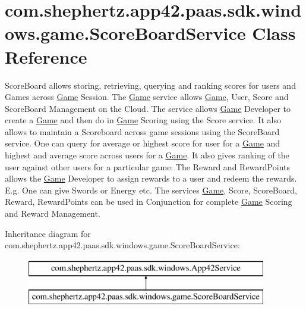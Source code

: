 \hypertarget{classcom_1_1shephertz_1_1app42_1_1paas_1_1sdk_1_1windows_1_1game_1_1_score_board_service}{\section{com.\+shephertz.\+app42.\+paas.\+sdk.\+windows.\+game.\+Score\+Board\+Service Class Reference}
\label{classcom_1_1shephertz_1_1app42_1_1paas_1_1sdk_1_1windows_1_1game_1_1_score_board_service}
}


Score\+Board allows storing, retrieving, querying and ranking scores for users and Games across \hyperlink{classcom_1_1shephertz_1_1app42_1_1paas_1_1sdk_1_1windows_1_1game_1_1_game}{Game} Session. The \hyperlink{classcom_1_1shephertz_1_1app42_1_1paas_1_1sdk_1_1windows_1_1game_1_1_game}{Game} service allows \hyperlink{classcom_1_1shephertz_1_1app42_1_1paas_1_1sdk_1_1windows_1_1game_1_1_game}{Game}, User, Score and Score\+Board Management on the Cloud. The service allows \hyperlink{classcom_1_1shephertz_1_1app42_1_1paas_1_1sdk_1_1windows_1_1game_1_1_game}{Game} Developer to create a \hyperlink{classcom_1_1shephertz_1_1app42_1_1paas_1_1sdk_1_1windows_1_1game_1_1_game}{Game} and then do in \hyperlink{classcom_1_1shephertz_1_1app42_1_1paas_1_1sdk_1_1windows_1_1game_1_1_game}{Game} Scoring using the Score service. It also allows to maintain a Scoreboard across game sessions using the Score\+Board service. One can query for average or highest score for user for a \hyperlink{classcom_1_1shephertz_1_1app42_1_1paas_1_1sdk_1_1windows_1_1game_1_1_game}{Game} and highest and average score across users for a \hyperlink{classcom_1_1shephertz_1_1app42_1_1paas_1_1sdk_1_1windows_1_1game_1_1_game}{Game}. It also gives ranking of the user against other users for a particular game. The Reward and Reward\+Points allows the \hyperlink{classcom_1_1shephertz_1_1app42_1_1paas_1_1sdk_1_1windows_1_1game_1_1_game}{Game} Developer to assign rewards to a user and redeem the rewards. E.\+g. One can give Swords or Energy etc. The services \hyperlink{classcom_1_1shephertz_1_1app42_1_1paas_1_1sdk_1_1windows_1_1game_1_1_game}{Game}, Score, Score\+Board, Reward, Reward\+Points can be used in Conjunction for complete \hyperlink{classcom_1_1shephertz_1_1app42_1_1paas_1_1sdk_1_1windows_1_1game_1_1_game}{Game} Scoring and Reward Management.  


Inheritance diagram for com.\+shephertz.\+app42.\+paas.\+sdk.\+windows.\+game.\+Score\+Board\+Service\+:\begin{figure}[H]
\begin{center}
\leavevmode
\includegraphics[height=2.000000cm]{classcom_1_1shephertz_1_1app42_1_1paas_1_1sdk_1_1windows_1_1game_1_1_score_board_service}
\end{center}
\end{figure}
